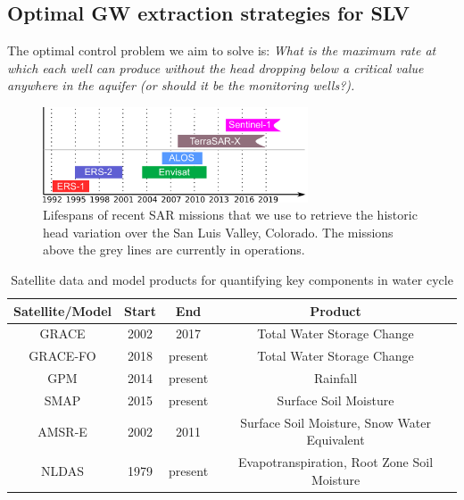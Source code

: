 \documentclass[11pt,final]{article}%
\begin{document}
\subsection{Optimal GW extraction strategies for SLV}\label{sec:proposed optimal}
The optimal control problem we aim to solve is: \emph{What is the maximum rate at which each well can produce without the head dropping below a critical value anywhere in the aquifer (or should it be the monitoring wells?).}

\begin{figure}
\noindent\includegraphics[width=0.7\textwidth]{Figures/InSARmissions.pdf}
\caption{Lifespans of recent SAR missions that we use to retrieve the historic head variation over the San Luis Valley, Colorado. The missions above the grey lines are currently in operations.}
\label{fig:insar-mission}
\end{figure}

\begin{table}
\caption{Satellite data and model products for quantifying key components in water cycle}
\centering
\begin{tabular}{c c c c }
\hline\hline
Satellite/Model & Start & End  & Product \\[0.5ex]
\hline
GRACE & 2002 & 2017 & Total Water Storage Change \\
GRACE-FO & 2018 & present & Total Water Storage Change \\
GPM & 2014 & present & Rainfall \\
SMAP & 2015& present & Surface Soil Moisture \\
AMSR-E & 2002 & 2011 & Surface Soil Moisture, Snow Water Equivalent \\
NLDAS & 1979 & present & Evapotranspiration, Root Zone Soil Moisture \\[1.0 ex]
\hline
\end{tabular}
\label{tb:data}
\end{table}

\end{document}
